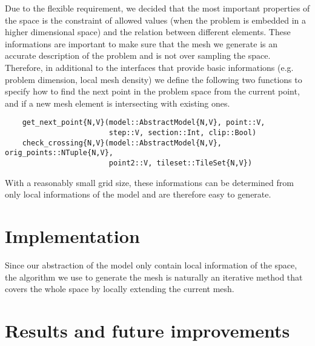 \documentclass[10pt,fleqn]{article}
\begin{document}
Due to the flexible requirement, we decided that the most important properties
of the space is the constraint of allowed values (when the problem is embedded
in a higher dimensional space) and the relation between different elements.
These informations are important to make sure that the mesh we generate is
an accurate description of the problem and is not over sampling the space.
Therefore, in additional to the interfaces that provide basic informations
(e.g. problem dimension, local mesh density) we define the following two
functions to specify how to find the next point in the problem space from
the current point, and if a new mesh element is intersecting with existing
ones.

\begin{lstlisting}
    get_next_point{N,V}(model::AbstractModel{N,V}, point::V,
                        step::V, section::Int, clip::Bool)
    check_crossing{N,V}(model::AbstractModel{N,V}, orig_points::NTuple{N,V},
                        point2::V, tileset::TileSet{N,V})
\end{lstlisting}

With a reasonably small grid size, these informations can be determined from
only local informations of the model and are therefore easy to generate.

\section{Implementation}

Since our abstraction of the model only contain local information of the space,
the algorithm we use to generate the mesh is naturally an iterative method
that covers the whole space by locally extending the current mesh.

\section{Results and future improvements}

\end{document}
